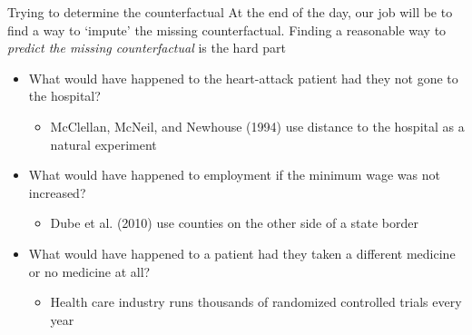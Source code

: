 \documentclass[aspectratio=169,t,11pt,table]{beamer}
\begin{document}
\begin{frame}{Trying to determine the counterfactual}
  At the end of the day, our job will be to find a way to `impute' the missing counterfactual. Finding a reasonable way to \emph{predict the missing counterfactual} is the hard part

  \bigskip
  \begin{itemize}
    \item What would have happened to the heart-attack patient had they not gone to the hospital? 
    \begin{itemize}
      \item McClellan, McNeil, and Newhouse (1994) use distance to the hospital as a natural experiment
    \end{itemize}
    
    \pause
    \bigskip
    \item What would have happened to employment if the minimum wage was not increased? 

    \begin{itemize}
      \item Dube et al. (2010) use counties on the other side of a state border
    \end{itemize}
    
    \pause
    \bigskip
    \item What would have happened to a patient had they taken a different medicine or no medicine at all?
    \begin{itemize}
      \item Health care industry runs thousands of randomized controlled trials every year
    \end{itemize} 
  \end{itemize}
\end{frame}
\end{document}
